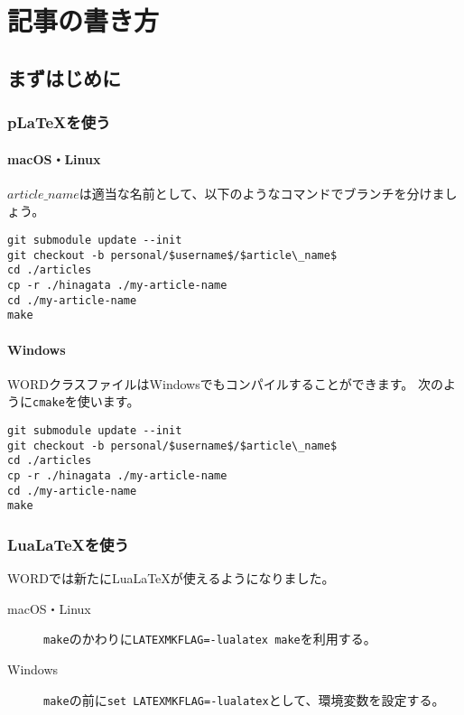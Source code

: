 \documentclass{word}
\subtitle{ヘッダの見出し}
\author{ほげ}
\begin{document}
\chapter{記事の書き方}

\section{まずはじめに}

\subsection{p\LaTeX を使う}

\subsubsection{macOS・Linux}

$article\_name$は適当な名前として、以下のようなコマンドでブランチを分けましょう。

\begin{lstlisting}[mathescape]
git submodule update --init
git checkout -b personal/$username$/$article\_name$
cd ./articles
cp -r ./hinagata ./my-article-name
cd ./my-article-name
make
\end{lstlisting}

\subsubsection{Windows}

WORDクラスファイルはWindowsでもコンパイルすることができます。
次のように\lstinline|cmake|を使います。

\begin{lstlisting}[mathescape]
git submodule update --init
git checkout -b personal/$username$/$article\_name$
cd ./articles
cp -r ./hinagata ./my-article-name
cd ./my-article-name
make
\end{lstlisting}

\subsection{Lua\LaTeX を使う}

WORDでは新たにLua\LaTeX が使えるようになりました。

\begin{description}
  \item[macOS・Linux] \lstinline|make|のかわりに\lstinline|LATEXMKFLAG=-lualatex make|を利用する。
 
  \item[Windows] \lstinline|make|の前に\lstinline|set LATEXMKFLAG=-lualatex|として、環境変数を設定する。
\end{description}
\end{document}
